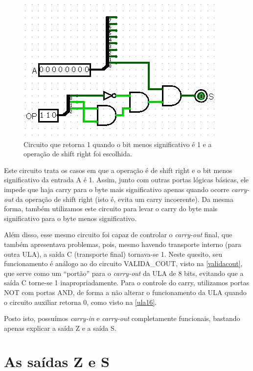 \documentclass[
	12pt,				%
	openright,			%
	twoside,			%
	a4paper,			%
	english,			%
	french,				%
	spanish,			%
	brazil,				%
	]{abntex2}
\begin{document}
\begin{figure}[H]
	\begin{center}
	    \includegraphics[scale=0.6]{CARRY_SHR.png}
	\end{center}
\caption{\label{carry_shr}Circuito que retorna 1 quando o bit menos  significativo é 1 e a operação de shift right foi escolhida.}
\end{figure}

Este circuito trata os casos em que a operação é de shift right e o bit menos significativo da entrada A é 1. Assim, junto com outras portas lógicas básicas, ele impede que haja carry para o byte mais significativo apenas quando ocorre \textit{carry-out} da operação de shift right (isto é, evita um carry incoerente). Da mesma forma, também utilizamos este circuito para levar o carry do byte mais significativo para o byte menos significativo. 

Além disso, esse mesmo circuito foi capaz de controlar o \textit{carry-out} final, que também apresentava problemas, pois, mesmo havendo transporte interno (para outra ULA), a saída C (transporte final) tornava-se 1. Neste quesito, seu funcionamento é análogo ao do circuito VALIDA\_COUT, visto na \autoref{validacout}, que serve como um ``portão'' para o \textit{carry-out} da ULA de 8 bits, evitando que a saída C torne-se 1 inapropriadamente. Para o controle do carry, utilizamos portas NOT com portas AND, de forma a não alterar o funcionamento da ULA quando o circuito auxiliar retorna 0, como visto na \autoref{ula16}.

Posto isto, possuímos \textit{carry-in} e \textit{carry-out} completamente funcionais, bastando apenas explicar a saída Z e a saída S.

\section{As saídas Z e S}
\end{document}
